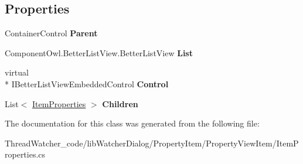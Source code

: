 \subsection*{Properties}
\begin{DoxyCompactItemize}
\item 
\hypertarget{classlib_watcher_dialog_1_1_property_item_1_1_item_properties_a31b12ff9d1866085db87752e7c783c1e}{Container\+Control {\bfseries Parent}}\label{classlib_watcher_dialog_1_1_property_item_1_1_item_properties_a31b12ff9d1866085db87752e7c783c1e}

\item 
\hypertarget{classlib_watcher_dialog_1_1_property_item_1_1_item_properties_a6904c68cfa6494756fc332b7cdee1b27}{Component\+Owl.\+Better\+List\+View.\+Better\+List\+View {\bfseries List}}\label{classlib_watcher_dialog_1_1_property_item_1_1_item_properties_a6904c68cfa6494756fc332b7cdee1b27}

\item 
\hypertarget{classlib_watcher_dialog_1_1_property_item_1_1_item_properties_a1581663b0b70877d54a26b94e426a86d}{virtual \\*
I\+Better\+List\+View\+Embedded\+Control {\bfseries Control}}\label{classlib_watcher_dialog_1_1_property_item_1_1_item_properties_a1581663b0b70877d54a26b94e426a86d}

\item 
\hypertarget{classlib_watcher_dialog_1_1_property_item_1_1_item_properties_a35dc08339989262e9ca349d33b3f4c53}{List$<$ \hyperlink{classlib_watcher_dialog_1_1_property_item_1_1_item_properties}{Item\+Properties} $>$ {\bfseries Children}}\label{classlib_watcher_dialog_1_1_property_item_1_1_item_properties_a35dc08339989262e9ca349d33b3f4c53}

\end{DoxyCompactItemize}


The documentation for this class was generated from the following file\+:\begin{DoxyCompactItemize}
\item 
Thread\+Watcher\+\_\+code/lib\+Watcher\+Dialog/\+Property\+Item/\+Property\+View\+Item/Item\+Properties.\+cs\end{DoxyCompactItemize}
